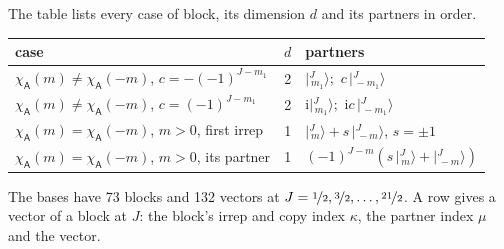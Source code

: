 \documentclass[10pt,a4paper]{article}
\numberwithin{equation}{section}
\newcommand{\grp}[1]{\mathsf{#1}}
\newcommand{\iunit}{\mathrm{i}}
\newcommand{\chiA}{\chi_{\grp{A}}}
\newcommand{\mult}{\kappa}
\newcommand{\intx}{\mu}
\newcommand{\jm}[2]{\bigl\lvert{}^{#1}_{\,#2}\bigr\rangle}
\begin{document}
\leavevmode\label{n:head.case}\label{n:head.partners}The table lists every case of block, its dimension $d$ and its partners in order.
\begin{center}\begin{tabular}{@{}lrl@{}}\toprule
case & $d$ & partners\\\midrule
$\chiA(m) \ne \chiA(-m)$, $c = -(-1)^{J-m_1}$ & 2 & $\jm{J}{m_1}$;\ $c\,\jm{J}{-m_1}$\\
$\chiA(m) \ne \chiA(-m)$, $c = (-1)^{J-m_1}$ & 2 & $\iunit\jm{J}{m_1}$;\ $\iunit c\,\jm{J}{-m_1}$\\
$\chiA(m) = \chiA(-m)$, $m > 0$, first irrep & 1 & $\jm{J}{m} + s\,\jm{J}{-m}$, $s = \pm1$\\
$\chiA(m) = \chiA(-m)$, $m > 0$, its partner & 1 & $(-1)^{J-m}(s\,\jm{J}{m} + \jm{J}{-m})$\\
\bottomrule\end{tabular}\end{center}
The bases have 73 blocks and 132 vectors at $J = \nicefrac{1}{2}, \nicefrac{3}{2}, \dots, \nicefrac{21}{2}$. \label{n:head.vector}A row gives a vector of a block at $J$: the block's irrep and copy index $\mult$, the partner index $\intx$ and the vector.
\end{document}
